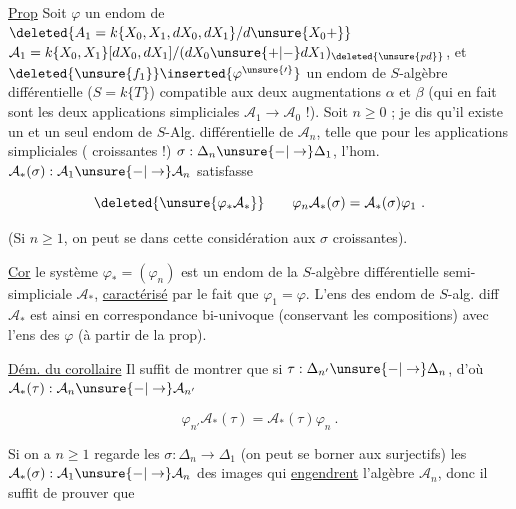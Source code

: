 
 \uline{Prop} Soit $\varphi$ un endom de $\deleted{A_1=k\{X_0,X_1,dX_0,dX_1\}/d\unsure{X_0+}}$ $\mathcal A_1=k\{X_0,X_1\}[dX_0,dX_1]/(dX_0\unsure{+|-}dX_1)_{\deleted{\unsure{pd}}}$, et $\deleted{\unsure{f_1}}\inserted{\varphi^{\unsure{\prime}}}$ un endom de $S$-algèbre différentielle ($S=k\{T\}$) compatible aux deux augmentations $\alpha$ et $\beta$ (qui en fait sont les deux applications simpliciales $\mathcal A_1\to\mathcal A_0$ !). Soit $n\geq0$ ; je dis qu'il existe un et un seul endom de $S$-Alg. différentielle de $\mathcal A_n$, telle que pour les applications simpliciales ( croissantes !) $\sigma:\Delta_n\unsure{-|\to}\Delta_1$, l'hom. $\mathcal A_*(\sigma):\mathcal A_1\unsure{-|\to}\mathcal A_n$ satisfasse

\[
\deleted{\unsure{\varphi_*\mathcal A_*}}\qquad\varphi_n\mathcal A_*(\sigma)=\mathcal A_*(\sigma)\varphi_1\ .
\]

 (Si $n\geq1$, on peut se   dans cette considération aux $\sigma$ croissantes).


\uline{Cor}  le système $\varphi_*=(\varphi_n)$ est un endom de la $S$-algèbre différentielle semi-simpliciale $\mathcal A_*$, \uline{caractérisé} par le fait que $\varphi_1=\varphi$. L'ens des endom de $S$-alg. diff $\mathcal A_*$ est ainsi en correspondance bi-univoque (conservant les compositions) avec l'ens des $\varphi$ 
(à partir de la prop).

\uline{Dém. du corollaire} Il suffit de montrer que si $\tau:\Delta_{n'}\unsure{-|\to}\Delta_n$, d'où $\mathcal A_*(\tau):\mathcal A_n\unsure{-|\to}\mathcal A_{n'}$

\[
\varphi_{n'}\mathcal A_*(\tau)=\mathcal A_*(\tau)\varphi_n\ .
\]

 Si on a $n\geq1$   regarde les $\sigma:\Delta_n\to\Delta_1$  (on peut se borner aux surjectifs)  les $\mathcal A_*(\sigma):\mathcal A_1\unsure{-|\to}\mathcal A_n$  des images qui \uline{engendrent} l'algèbre $\mathcal A_n$, donc il suffit de prouver que

